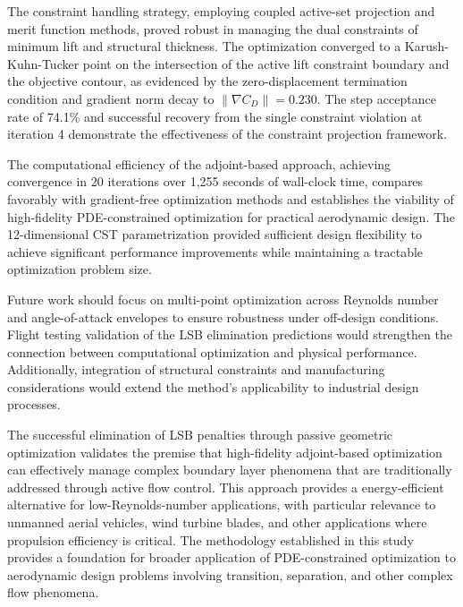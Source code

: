 The constraint handling strategy, employing coupled active-set projection and merit function methods, proved robust in managing the dual constraints of minimum lift and structural thickness. The optimization converged to a Karush-Kuhn-Tucker point on the intersection of the active lift constraint boundary and the objective contour, as evidenced by the zero-displacement termination condition and gradient norm decay to $\|\nabla C_D\| = 0.230$. The step acceptance rate of 74.1\% and successful recovery from the single constraint violation at iteration 4 demonstrate the effectiveness of the constraint projection framework.

The computational efficiency of the adjoint-based approach, achieving convergence in 20 iterations over 1,255 seconds of wall-clock time, compares favorably with gradient-free optimization methods and establishes the viability of high-fidelity PDE-constrained optimization for practical aerodynamic design. The 12-dimensional CST parametrization provided sufficient design flexibility to achieve significant performance improvements while maintaining a tractable optimization problem size.

Future work should focus on multi-point optimization across Reynolds number and angle-of-attack envelopes to ensure robustness under off-design conditions. Flight testing validation of the LSB elimination predictions would strengthen the connection between computational optimization and physical performance. Additionally, integration of structural constraints and manufacturing considerations would extend the method's applicability to industrial design processes.

The successful elimination of LSB penalties through passive geometric optimization validates the premise that high-fidelity adjoint-based optimization can effectively manage complex boundary layer phenomena that are traditionally addressed through active flow control. This approach provides a energy-efficient alternative for low-Reynolds-number applications, with particular relevance to unmanned aerial vehicles, wind turbine blades, and other applications where propulsion efficiency is critical. The methodology established in this study provides a foundation for broader application of PDE-constrained optimization to aerodynamic design problems involving transition, separation, and other complex flow phenomena.